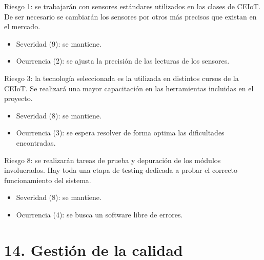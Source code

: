 \documentclass[
11pt, %
]{charter}
\begin{document}
Riesgo 1: se trabajarán con sensores estándares utilizados en las clases de CEIoT. De ser necesario se cambiarán los sensores por otros más precisos que existan en el mercado.
\begin{itemize}
	\item Severidad (9): se mantiene.
	\item Ocurrencia (2): se ajusta la precisión de las lecturas de los sensores.
\end{itemize}   


Riesgo 3: la tecnología seleccionada es la utilizada en distintos cursos de la CEIoT. Se realizará una mayor capacitación en las herramientas incluidas en el proyecto.
\begin{itemize}
	\item Severidad (8): se mantiene.
	\item Ocurrencia (3): se espera resolver de forma optima las dificultades encontradas.
\end{itemize}   
 
Riesgo 8: se realizarán tareas de prueba y depuración de los módulos involucrados. Hay toda una etapa de testing dedicada a probar el correcto funcionamiento del sistema.
\begin{itemize}
	\item Severidad (8): se mantiene.
	\item Ocurrencia (4): se busca un software libre de errores.
\end{itemize}   



\section{14. Gestión de la calidad}
\label{sec:calidad}

\end{document}
